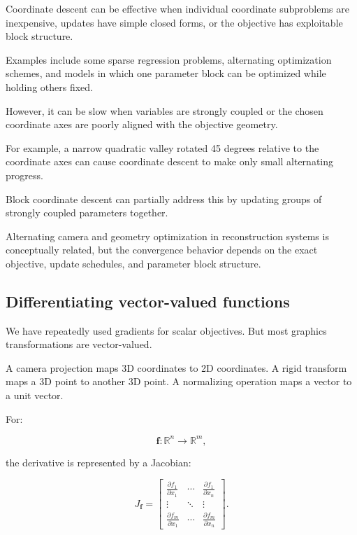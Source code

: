 \hypertarget{02-foundations-ii-ch027-when-coordinate-descent-helps}{}

Coordinate descent can be effective when individual coordinate subproblems are inexpensive, updates have simple closed forms, or the objective has exploitable block structure.

Examples include some sparse regression problems, alternating optimization schemes, and models in which one parameter block can be optimized while holding others fixed.

However, it can be slow when variables are strongly coupled or the chosen coordinate axes are poorly aligned with the objective geometry.

For example, a narrow quadratic valley rotated 45 degrees relative to the coordinate axes can cause coordinate descent to make only small alternating progress.

Block coordinate descent can partially address this by updating groups of strongly coupled parameters together.

Alternating camera and geometry optimization in reconstruction systems is conceptually related, but the convergence behavior depends on the exact objective, update schedules, and parameter block structure.

\subsection{Differentiating vector-valued functions}\label{02-foundations-ii-ch027-differentiating-vector-valued-functions}

\hypertarget{02-foundations-ii-ch027-differentiating-vector-valued-functions}{}

We have repeatedly used gradients for scalar objectives. But most graphics transformations are vector-valued.

A camera projection maps 3D coordinates to 2D coordinates. A rigid transform maps a 3D point to another 3D point. A normalizing operation maps a vector to a unit vector.

For:

\[
\mathbf f:\mathbb R^n\rightarrow\mathbb R^m,
\]

the derivative is represented by a Jacobian:

\[
\boxed{ J_{\mathbf f}= \begin{bmatrix} \frac{\partial f_1}{\partial x_1}&\cdots&\frac{\partial f_1}{\partial x_n}\\ \vdots&\ddots&\vdots\\ \frac{\partial f_m}{\partial x_1}&\cdots&\frac{\partial f_m}{\partial x_n} \end{bmatrix} }.
\]


